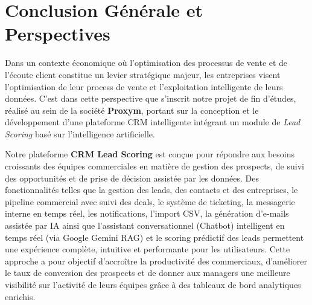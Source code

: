 
\chapter*{Conclusion Générale et Perspectives}

Dans un contexte économique où l'optimisation des processus de vente et de l'écoute client constitue un levier stratégique majeur, les entreprises visent l'optimisation de leur process de vente et l'exploitation intelligente de leurs données. C'est dans cette perspective que s'inscrit notre projet de fin d'études, réalisé au sein de la société \textbf{Proxym}, portant sur la conception et le développement d'une plateforme CRM intelligente intégrant un module de \textit{Lead Scoring} basé sur l'intelligence artificielle.

Notre plateforme \textbf{CRM Lead Scoring} est conçue pour répondre aux besoins croissants des équipes commerciales en matière de gestion des prospects, de suivi des opportunités et de prise de décision assistée par les données. Des fonctionnalités telles que la gestion des leads, des contacts et des entreprises, le pipeline commercial avec suivi des deals, le système de ticketing, la messagerie interne en temps réel, les notifications, l'import CSV, la génération d'e-mails assistée par IA ainsi que l'assistant conversationnel (Chatbot) intelligent en temps réel (via Google Gemini RAG) et le scoring prédictif des leads permettent une expérience complète, intuitive et performante pour les utilisateurs. Cette approche a pour objectif d'accroître la productivité des commerciaux, d'améliorer le taux de conversion des prospects et de donner aux managers une meilleure visibilité sur l'activité de leurs équipes grâce à des tableaux de bord analytiques enrichis.


